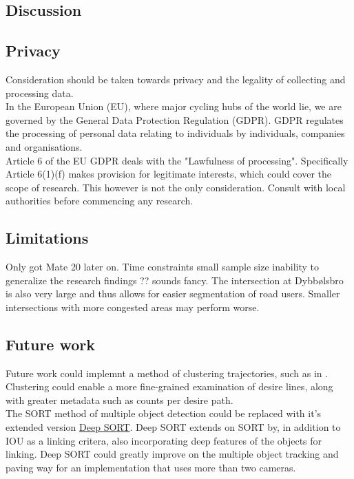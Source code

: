 \subsection{Discussion}

\subsection{Privacy}

Consideration should be taken towards privacy and the legality of collecting and processing data.
\ \\
In the European Union (EU), where major cycling hubs of the world lie, we are governed by 
the General Data Protection Regulation (GDPR). GDPR regulates the processing of personal data 
relating to individuals by individuals, companies and organisations.
\ \\
Article 6 of the EU GDPR deals with the "Lawfulness of processing". Specifically Article 6(1)(f)
makes provision for legitimate interests, which could cover the scope of research.
This however is not the only consideration. Consult with local authorities before commencing any research.

\subsection{Limitations}
Only got Mate 20 later on.
Time constraints
small sample size
inability to generalize the research findings ?? sounds fancy.
The intersection at Dybbølsbro is also very large and thus allows for easier segmentation of road users. 
Smaller intersections with more congested areas may perform worse. 
\ \\

\subsection{Future work}

Future work could implemnt a method of clustering trajectories,
such as in \cite{gariel_trajectory_2011}. Clustering could enable a more fine-grained examination of desire lines,
along with greater metadata such as counts per desire path.
\ \\

The SORT method of multiple object detection could be replaced with it's extended version \href{https://github.com/nwojke/deep_sort}{Deep SORT}.
Deep SORT extends on SORT by, in addition to IOU as a linking critera, also incorporating
deep features of the objects for linking. Deep SORT could greatly improve on the multiple object tracking
and paving way for an implementation that uses more than two cameras.
\ \\